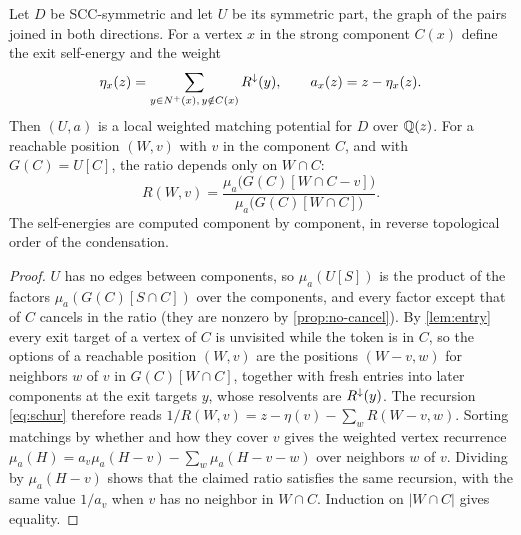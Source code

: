 \begin{theorem}\label{thm:directed-collapse}
Let $D$ be SCC-symmetric and let $U$ be its symmetric part, the graph of the pairs joined in both directions. For a vertex $x$ in the strong component $C(x)$ define the exit self-energy and the weight
\[
\eta_x(z)=\sum_{y\in N^{+}(x),\,y\notin C(x)}R^{\downarrow}(y),\qquad a_x(z)=z-\eta_x(z).
\]
Then $(U,a)$ is a local weighted matching potential for $D$ over $\mathbb{Q}(z)$. For a reachable position $(W,v)$ with $v$ in the component $C$, and with $G(C)=U[C]$, the ratio depends only on $W\cap C$:
\[
R(W,v)=\frac{\mu_a\bigl(G(C)[W\cap C-v]\bigr)}{\mu_a\bigl(G(C)[W\cap C]\bigr)}.
\]
The self-energies are computed component by component, in reverse topological order of the condensation.
\end{theorem}

\begin{proof}
$U$ has no edges between components, so $\mu_a(U[S])$ is the product of the factors $\mu_a(G(C)[S\cap C])$ over the components, and every factor except that of $C$ cancels in the ratio (they are nonzero by \cref{prop:no-cancel}). By \cref{lem:entry} every exit target of a vertex of $C$ is unvisited while the token is in $C$, so the options of a reachable position $(W,v)$ are the positions $(W-v,w)$ for neighbors $w$ of $v$ in $G(C)[W\cap C]$, together with fresh entries into later components at the exit targets $y$, whose resolvents are $R^{\downarrow}(y)$. The recursion \eqref{eq:schur} therefore reads $1/R(W,v)=z-\eta(v)-\sum_wR(W-v,w)$. Sorting matchings by whether and how they cover $v$ gives the weighted vertex recurrence $\mu_a(H)=a_v\mu_a(H-v)-\sum_w\mu_a(H-v-w)$ over neighbors $w$ of $v$. Dividing by $\mu_a(H-v)$ shows that the claimed ratio satisfies the same recursion, with the same value $1/a_v$ when $v$ has no neighbor in $W\cap C$. Induction on $|W\cap C|$ gives equality.
\end{proof}

